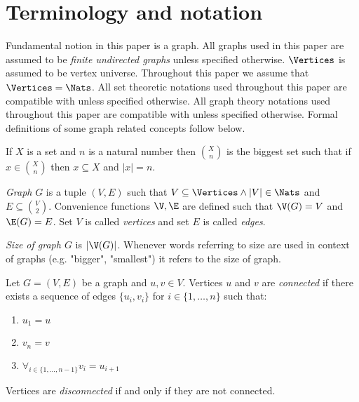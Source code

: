 
\section{Terminology and notation}

Fundamental notion in this paper is a graph. All graphs used in this paper are assumed to be \emph{finite undirected graphs} unless specified otherwise. $\Vertices$ is assumed to be vertex universe. Throughout this paper we assume that $\Vertices = \Nats$. All set theoretic notations used throughout this paper are compatible with \cite{jech} unless specified otherwise. All graph theory notations used throughout this paper are compatible with \cite{bollobas} unless specified otherwise. Formal definitions of some graph related concepts follow below.

\begin{defi}
    If $X$ is a set and $n$ is a natural number then $\binom{X}{n}$ is the biggest set such that if $x \in \binom{X}{n}$ then $x \subseteq X$ and $|x| = n$.
\end{defi}

\begin{defi}
    \emph{Graph} $G$ is a tuple $(V,E)$ such that $V \subseteq \Vertices \land |V| \in \Nats$ and $E \subseteq \binom{V}{2}$. Convenience functions $\V, \E$ are defined such that $\V(G) = V$ and $\E(G) = E$. Set $V$ is called \emph{vertices} and set $E$ is called \emph{edges}.
\end{defi}

\begin{defi}
    \emph{Size of graph $G$} is $|\V(G)|$. Whenever words referring to size are used in context of graphs (e.g. "bigger", "smallest") it refers to the size of graph.
\end{defi}

\begin{defi}
    Let $G = (V,E)$ be a graph and $u, v \in V$. Vertices $u$ and $v$ are \emph{connected} if there exists a sequence of edges $\{u_i,v_i\}$ for $i \in \{1, \ldots, n\}$ such that:
    \begin{enumerate}
        \item $u_1 = u$
        \item $v_n = v$
        \item $\forall_{i \in \{1, \ldots, n - 1\}} v_i = u_{i+1}$
    \end{enumerate}

    Vertices are \emph{disconnected} if and only if they are not connected.
\end{defi}

